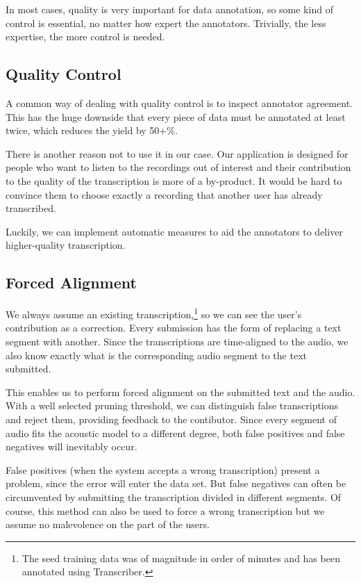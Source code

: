 \documentclass{itatnew}
\begin{document}
In most cases, quality is very important for data annotation, so some kind of
control is essential, no matter how expert the annotators. Trivially, the less
expertise, the more control is needed.

\subsection{Quality Control}

A common way of dealing with quality control is to inspect annotator agreement.
This has the huge downside that every piece of data must be annotated at least
twice, which reduces the yield by 50+\%.

There is another reason not to use it in our case. Our application is
designed for people who want to listen to the recordings out of interest and
their contribution to the quality of the transcription is more of a by-product.
It would be hard to convince them to choose exactly a recording that another
user has already transcribed.

Luckily, we can implement automatic measures to aid the annotators to deliver
higher-quality transcription.

\subsection{Forced Alignment}

We always assume an existing transcription,\footnote{The seed training data
was of magnitude in order of minutes and has been annotated using Transcriber.}
so we can see the user's contribution as a correction. Every submission has
the form of replacing a text segment with another. Since the transcriptions are
time-aligned to the audio, we also know exactly what is the corresponding audio
segment to the text submitted.

This enables us to perform forced alignment on the submitted text and the audio.
With a well selected pruning threshold, we can distinguish false transcriptions
and reject them, providing feedback to the contibutor.
Since every segment of audio fits the acoustic model to a different degree, both
false positives and false negatives will inevitably occur.

False positives (when the system accepts a wrong transcription) present a
problem, since the error will enter the data set. But false negatives can often
be circumvented by submitting the transcription divided in different segments.
Of course, this method can also be used to force a wrong transcription but we
assume no malevolence on the part of the users.
\end{document}
